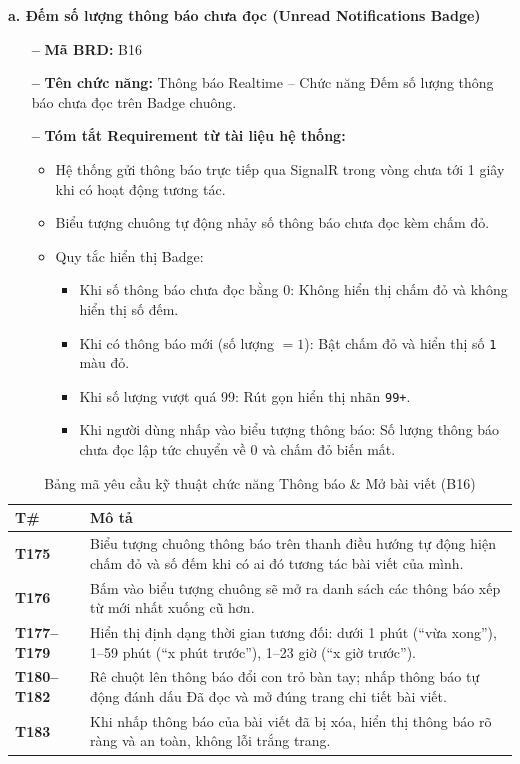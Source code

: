 \documentclass[11pt,a4paper]{article}
\begin{document}
\noindent\textbf{a. Đếm số lượng thông báo chưa đọc (Unread Notifications Badge)}
\begin{itemize}[leftmargin=1.2cm, noitemsep]
    \item[\textbf{--}] \textbf{Mã BRD:} B16
    \item[\textbf{--}] \textbf{Tên chức năng:} Thông báo Realtime -- Chức năng Đếm số lượng thông báo chưa đọc trên Badge chuông.
    \item[\textbf{--}] \textbf{Tóm tắt Requirement từ tài liệu hệ thống:}
    \begin{itemize}[leftmargin=0.8cm, label=$\bullet$, noitemsep]
        \item Hệ thống gửi thông báo trực tiếp qua SignalR trong vòng chưa tới 1 giây khi có hoạt động tương tác.
        \item Biểu tượng chuông tự động nhảy số thông báo chưa đọc kèm chấm đỏ.
        \item Quy tắc hiển thị Badge:
        \begin{itemize}[leftmargin=0.8cm, label=$\circ$, noitemsep]
            \item Khi số thông báo chưa đọc bằng 0: Không hiển thị chấm đỏ và không hiển thị số đếm.
            \item Khi có thông báo mới (số lượng $= 1$): Bật chấm đỏ và hiển thị số \texttt{1} màu đỏ.
            \item Khi số lượng vượt quá 99: Rút gọn hiển thị nhãn \texttt{99+}.
            \item Khi người dùng nhấp vào biểu tượng thông báo: Số lượng thông báo chưa đọc lập tức chuyển về 0 và chấm đỏ biến mất.
        \end{itemize}
    \end{itemize}
\end{itemize}

\begin{table}[H]
\centering
\small
\begin{tabularx}{\textwidth}{|C{1.5cm}|X|}
\hline
{}
\textbf{T\#} & \textbf{Mô tả} \tabularnewline
\hline
\textbf{T175} & Biểu tượng chuông thông báo trên thanh điều hướng tự động hiện chấm đỏ và số đếm khi có ai đó tương tác bài viết của mình. \\ \hline
\textbf{T176} & Bấm vào biểu tượng chuông sẽ mở ra danh sách các thông báo xếp từ mới nhất xuống cũ hơn. \\ \hline
\textbf{T177--T179} & Hiển thị định dạng thời gian tương đối: dưới 1 phút (``vừa xong''), 1--59 phút (``x phút trước''), 1--23 giờ (``x giờ trước''). \\ \hline
\textbf{T180--T182} & Rê chuột lên thông báo đổi con trỏ bàn tay; nhấp thông báo tự động đánh dấu Đã đọc và mở đúng trang chi tiết bài viết. \\ \hline
\textbf{T183} & Khi nhấp thông báo của bài viết đã bị xóa, hiển thị thông báo rõ ràng và an toàn, không lỗi trắng trang. \\ \hline
\end{tabularx}
\caption{Bảng mã yêu cầu kỹ thuật chức năng Thông báo \& Mở bài viết (B16)}
\end{table}
\end{document}
